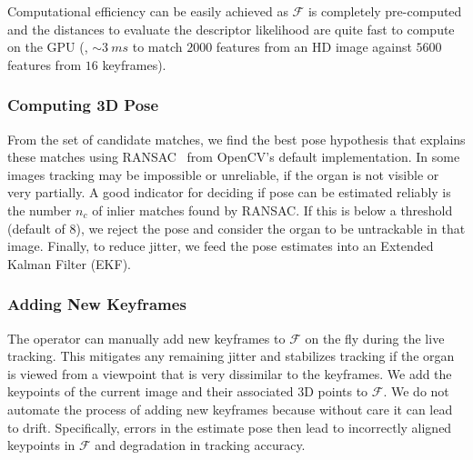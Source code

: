 Computational efficiency can be easily achieved as $\mathcal{F}$ is completely pre-computed and the distances to evaluate the descriptor likelihood are quite fast to compute on the GPU (\eg, $\sim\SI{3}{ms}$ to match $2000$ features from an HD image against $5600$ features from $16$ keyframes).

\subsubsection{Computing 3D Pose}
From the set of candidate matches, we find the best pose hypothesis that explains these  matches using   RANSAC~\cite{Fischler:1981:RSC:358669.358692} from OpenCV's default implementation.
In some images tracking may be impossible or unreliable, if the organ is not visible or very partially. A good indicator for deciding if pose can be estimated reliably is the number $n_c$ of inlier matches found by RANSAC. If this is below a threshold (default of $8$), we reject the pose and consider the organ to be untrackable in that image. Finally, to reduce jitter, we feed the pose estimates into an Extended Kalman Filter (EKF). 

\subsubsection{Adding New Keyframes}
The operator can manually add new keyframes to $\mathcal{F}$ on the fly during the live tracking.
This mitigates any remaining jitter and stabilizes tracking if the organ is viewed from a viewpoint that is very dissimilar to the keyframes.
We add the keypoints of the current image and their associated 3D points to $\mathcal{F}$.
We do not automate the process of adding new keyframes because without care it can lead to drift.
Specifically, errors in the estimate pose then lead to incorrectly aligned keypoints in $\mathcal{F}$ and degradation in tracking accuracy.

